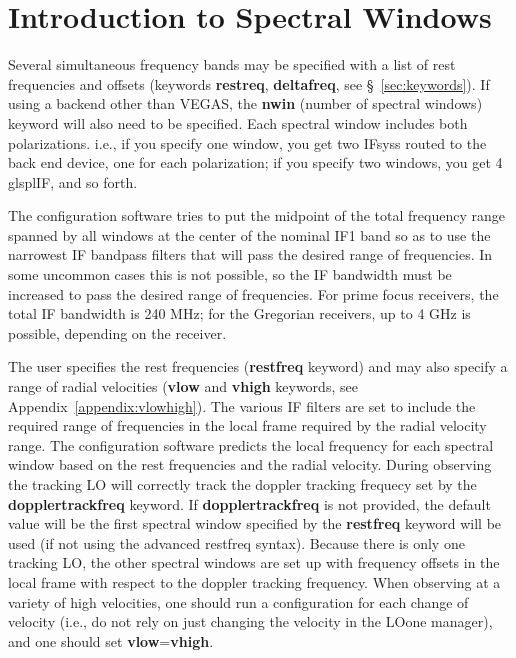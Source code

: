 \chapter{Introduction to Spectral Windows}\label{appendix:spectralwindows}

Several simultaneous frequency bands may be specified with a list of rest
frequencies and offsets (keywords {\bf restreq}, {\bf deltafreq}, see
\S~\ref{sec:keywords}). If using a backend other than \gls{VEGAS}, the
{\bf nwin} (number of spectral windows) keyword will also need to be specified.
Each spectral window includes both polarizations. i.e., if you specify one window,
you get two \glspl{IFsys} routed to the back end device, one for each
polarization; if you specify two windows, you get 4 glspl{IF}, and so forth.

The configuration software tries to put the midpoint of the total frequency range 
spanned by all windows at the center of the nominal IF1 band so as to use the 
narrowest \gls{IF} bandpass filters that will pass the desired range of frequencies.
In some uncommon cases this is not possible, so the \gls{IF} bandwidth must be
increased to pass the desired range of frequencies. For prime focus receivers, the
total \gls{IF} bandwidth is 240 MHz; for the Gregorian receivers, up to 4 GHz is
possible, depending on the receiver.

The user specifies the rest frequencies ({\bf restfreq} keyword) and may also
specify a range of radial velocities ({\bf vlow} and {\bf vhigh} keywords,
see Appendix~\ref{appendix:vlowhigh}). The various \gls{IF} filters are set to 
include the required range of frequencies in the local frame required by the 
radial velocity range. The configuration software predicts the local frequency for 
each spectral window based on the rest frequencies and the radial velocity. 
During observing the tracking \gls{LO} will correctly track the doppler tracking
frequecy set by the {\bf dopplertrackfreq} keyword.  If {\bf dopplertrackfreq} is
not provided, the default value will be the first spectral window specified by the
{\bf restfreq} keyword will be used (if not using the advanced restfreq syntax).
Because there is only one tracking \gls{LO}, the other spectral windows are set
up with frequency offsets in the local frame with respect to the doppler tracking
frequency. When observing at a variety of high velocities, one should run a
configuration for each change of velocity (i.e., do not rely on just changing the
velocity in the \gls{LOone} manager), and one should set {\bf vlow}={\bf vhigh}.  

